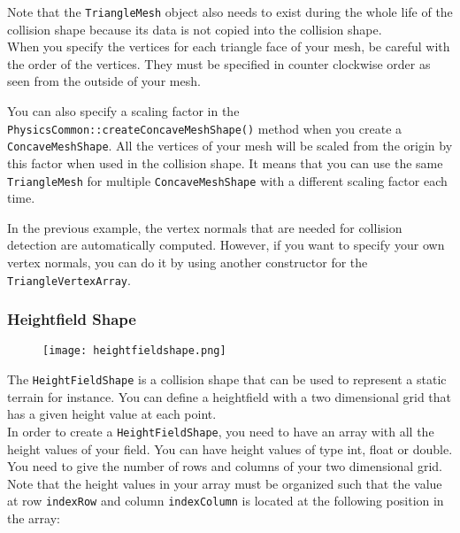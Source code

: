 \documentclass[a4paper,12pt]{article}
\begin{document}
  \vspace{0.6cm}

  Note that the \texttt{TriangleMesh} object also needs to exist during the whole life of the collision shape because its
  data is not copied into the collision shape. \\

  When you specify the vertices for each triangle face of your mesh, be careful with the order of the vertices. They must be specified in counter
  clockwise order as seen from the outside of your mesh. \\

  \begin{sloppypar}
  You can also specify a scaling factor in the \texttt{PhysicsCommon::createConcaveMeshShape()} method when you create a
  \texttt{Concave\allowbreak MeshShape}.
  All the vertices of your mesh will be scaled from the origin by this factor when used in the collision shape. It means that you can use the same
  \texttt{TriangleMesh} for multiple \texttt{ConcaveMeshShape} with a different scaling factor each time. \\
  \end{sloppypar}

  In the previous example, the vertex normals that are needed for collision detection are automatically computed. However, if you want to specify your own
  vertex normals, you can do it by using another constructor for the \texttt{TriangleVertexArray}. \\

  \subsubsection{Heightfield Shape}

  \begin{figure}[h]
      \centering
      \texttt{[image: heightfieldshape.png]}
      \label{fig:heightfieldshape}
  \end{figure}

  The \texttt{HeightFieldShape} is a collision shape that can be used to represent a static terrain for instance. You can
  define a heightfield with a two dimensional grid that has a given height value at each point. \\

  In order to create a \texttt{HeightFieldShape}, you need to have an array with all the height values of your field.
  You can have height values of type int, float or double. You need to give the number of rows and columns of your two
  dimensional grid. Note that the height values in your array must be organized such that the value at row
  \texttt{indexRow} and column \texttt{indexColumn} is located at the following position in the array: \\
\end{document}
